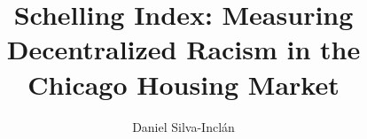 \title{Schelling Index: Measuring Decentralized Racism in the Chicago Housing Market}
\author{Daniel Silva-Incl\'{a}n}

